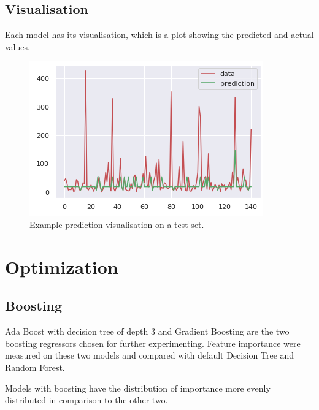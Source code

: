 \documentclass[sigconf]{acmart}
\begin{document}
\subsection{Visualisation}
Each model has its visualisation, which is a plot showing the predicted and actual values.

\begin{figure}[h]
    \includegraphics[width=\linewidth]{5-eval.png}
    \centering
    \caption{Example prediction visualisation on a test set.}
\end{figure}

\section{Optimization}
\subsection{Boosting}
Ada Boost with decision tree of depth $3$ and Gradient Boosting are the two boosting regressors chosen for further experimenting.
Feature importance were measured on these two models and compared with default Decision Tree and Random Forest.

Models with boosting have the distribution of importance more evenly distributed in comparison to the other two.
\end{document}
